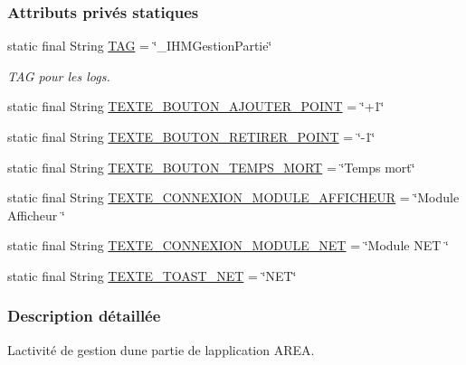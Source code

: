 \subsubsection*{Attributs privés statiques}
\begin{DoxyCompactItemize}
\item 
static final String \hyperlink{classcom_1_1example_1_1area_1_1_i_h_m_gestion_partie_a78af1eb84e4a48b7f69c3ebee193933c}{T\+AG} = \char`\"{}\+\_\+\+I\+H\+M\+Gestion\+Partie\char`\"{}
\begin{DoxyCompactList}\small\item\em T\+AG pour les logs. \end{DoxyCompactList}\item 
static final String \hyperlink{classcom_1_1example_1_1area_1_1_i_h_m_gestion_partie_a29eb33d17f8f318937bd01705f5769d8}{T\+E\+X\+T\+E\+\_\+\+B\+O\+U\+T\+O\+N\+\_\+\+A\+J\+O\+U\+T\+E\+R\+\_\+\+P\+O\+I\+NT} = \char`\"{}+1\char`\"{}
\item 
static final String \hyperlink{classcom_1_1example_1_1area_1_1_i_h_m_gestion_partie_a9218ba4464b7631738927d74539ac927}{T\+E\+X\+T\+E\+\_\+\+B\+O\+U\+T\+O\+N\+\_\+\+R\+E\+T\+I\+R\+E\+R\+\_\+\+P\+O\+I\+NT} = \char`\"{}-\/1\char`\"{}
\item 
static final String \hyperlink{classcom_1_1example_1_1area_1_1_i_h_m_gestion_partie_abc36e82bb3c4a2fb719305ea9e525c9b}{T\+E\+X\+T\+E\+\_\+\+B\+O\+U\+T\+O\+N\+\_\+\+T\+E\+M\+P\+S\+\_\+\+M\+O\+RT} = \char`\"{}Temps mort\char`\"{}
\item 
static final String \hyperlink{classcom_1_1example_1_1area_1_1_i_h_m_gestion_partie_a60d4b79c44e29fe68c565cf24ed6a22a}{T\+E\+X\+T\+E\+\_\+\+C\+O\+N\+N\+E\+X\+I\+O\+N\+\_\+\+M\+O\+D\+U\+L\+E\+\_\+\+A\+F\+F\+I\+C\+H\+E\+UR} = \char`\"{}Module Afficheur \char`\"{}
\item 
static final String \hyperlink{classcom_1_1example_1_1area_1_1_i_h_m_gestion_partie_a12cdd76d3c9dec83783e40a0d017ac17}{T\+E\+X\+T\+E\+\_\+\+C\+O\+N\+N\+E\+X\+I\+O\+N\+\_\+\+M\+O\+D\+U\+L\+E\+\_\+\+N\+ET} = \char`\"{}Module N\+ET \char`\"{}
\item 
static final String \hyperlink{classcom_1_1example_1_1area_1_1_i_h_m_gestion_partie_aa5b1cdff8bb4d6f6157ae215f43062c5}{T\+E\+X\+T\+E\+\_\+\+T\+O\+A\+S\+T\+\_\+\+N\+ET} = \char`\"{}N\+ET\char`\"{}
\end{DoxyCompactItemize}


\subsubsection{Description détaillée}
L\textquotesingle{}activité de gestion d\textquotesingle{}une partie de l\textquotesingle{}application A\+R\+EA. 

